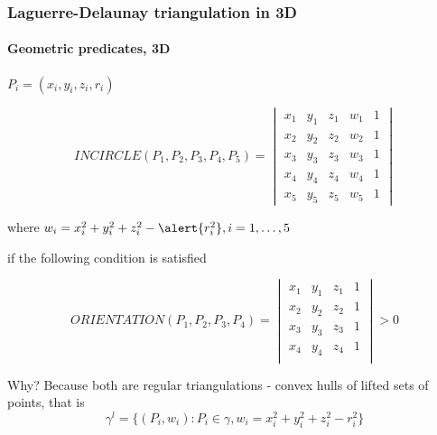 \documentclass[c, 10pt]{beamer}
\begin{document}
\begin{frame}\frametitle{Laguerre-Delaunay triangulation in 3D}\framesubtitle{Geometric predicates, 3D}
\begin{small}
$P_i = (x_i, y_i, z_i, r_i)$

$$INCIRCLE(P_1,P_2,P_3,P_4, P_5) = \begin{vmatrix} x_1 & y_1 & z_1 & w_1 & 1 \\
x_2 & y_2 & z_2 & w_2 & 1 \\
x_3 & y_3 & z_3 & w_3 & 1 \\
x_4 & y_4 & z_4 & w_4 & 1 \\
x_5 & y_5 & z_5 & w_5 & 1\end{vmatrix}$$

where $w_i = x_i^2  + y_i^2 + z_i^2 - \alert{r_i^2}, i = 1,\dots, 5$

if the following condition is satisfied

$$ORIENTATION(P_1,P_2,P_3,P_4) = 
\begin{vmatrix} 
x_1 & y_1 & z_1 & 1 \\
x_2 & y_2 & z_2 & 1 \\
x_3 & y_3 & z_3 & 1 \\
x_4 & y_4 & z_4 & 1 \\
\end{vmatrix} > 0$$

Why? Because both are \alert{regular triangulations} - convex hulls of lifted sets of points, that is
$$\gamma^l = \{(P_i, w_i): P_i \in \gamma, w_i = x_i^2  + y_i^2 + z_i^2 - r_i^2 \}$$

\end{small}
\end{frame}
\end{document}
